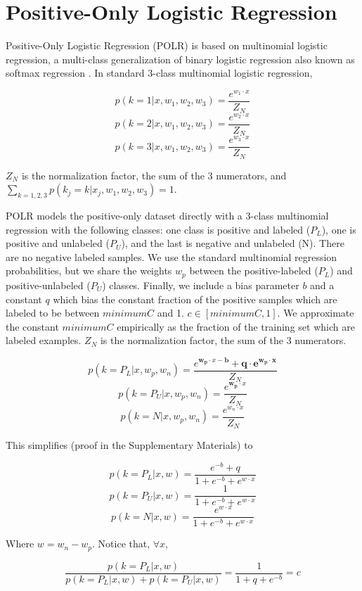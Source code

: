 \documentclass{article}
\begin{document}
\section{Positive-Only Logistic Regression}

Positive-Only Logistic Regression (POLR) is based on multinomial logistic regression, a multi-class generalization of binary logistic regression also known as softmax regression \cite{renie05}.  In standard 3-class multinomial logistic regression,

$$p(k=1 | x, w_1, w_2, w_3) =  \frac{e^{w_1 \cdot x}}{Z_N}$$
$$p(k=2 | x, w_1, w_2, w_3) =  \frac{e^{w_2 \cdot x}}{Z_N}$$
$$p(k=3 | x, w_1, w_2, w_3) =  \frac{e^{w_3 \cdot x}}{Z_N}$$

$Z_N$ is the normalization factor, the sum of the 3 numerators, and $\sum_{k=1,2,3}{p(k_j=k|x_j, w_1, w_2, w_3)} = 1$.

POLR models the positive-only dataset directly with a 3-class multinomial regression with the following classes: one class is positive and labeled ($P_L$), one is positive and unlabeled ($P_U$), and the last is negative and unlabeled (N).  There are no negative labeled samples.  We use the standard multinomial regression probabilities, but we share the weights $w_p$ between the positive-labeled ($P_L$) and positive-unlabeled ($P_U$) classes. Finally, we include a bias parameter $b$ and a constant $q$ which bias the constant fraction of the positive samples which are labeled to be between $minimumC$ and 1. $c \in [minimumC, 1]$.  We approximate the constant $minimumC$ empirically as the fraction of the training set which are labeled examples.  $Z_N$ is the normalization factor, the sum of the 3 numerators.

$$p(k=P_L | x, w_p, w_n) =  \frac{e^{\mathbf{w_p} \cdot x - \mathbf{b}} + \mathbf{q \cdot e^{w_p \cdot x}}}{Z_N}$$
$$p(k=P_U | x, w_p, w_n) =  \frac{e^{\mathbf{w_p} \cdot x}}{Z_N}$$
$$p(k=N | x, w_p, w_n) =  \frac{e^{w_n \cdot x}}{Z_N}$$

This simplifies (proof in the Supplementary Materials) to

$$ p(k=P_L | x, w) = \frac{e^{-b} + q}{1 + e^{-b} + e^{w \cdot x}}$$
$$ p(k=P_U | x, w) =  \frac{1}{1 + e^{-b} + e^{w \cdot x}}$$
$$ p(k=N | x, w) = \frac{e^{w \cdot x}}{1 + e^{-b} + e^{w \cdot x}}$$

Where $w = w_n - w_p$. Notice that, $\forall x$,

$$\frac{p(k=P_L | x, w)}{p(k=P_L | x, w) + p(k=P_U | x, w)} = \frac{1}{1 + q + e^{-b}} = c$$
\end{document}
